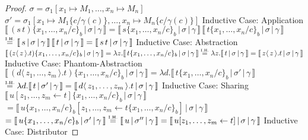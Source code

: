 \documentclass[a4paper,UKenglish,cleveref, autoref]{lipics-v2019}
\newcommand{\abs}[2]{\lambda #1 . #2}
\newcommand{\app}[2]{#1 \, #2}
\newcommand{\fake}[3]{#1 \langle \, #2 \, \rangle . #3}
\newcommand{\share}[3]{#1 [#2 \leftarrow #3]}
\newcommand{\sub}[3]{#1 \{ #2 / #3 \}}
\newcommand{\psub}[3]{#1 \{ #2 / #3 \}_{b}}
\newcommand{\readbackwmap}[3]{\llbracket \, #1 \, \vert \, #2 \, \vert \, #3  \, \rrbracket }
\newcommand{\IH}{\stackrel{\hbox{\tiny I.H.}}{\hbox{=}}}
\begin{document}
\begin{proof}
$\sigma = \sigma_{1} [x_{1} \mapsto M_{1} , \dots , x_{n} \mapsto M_{n} ]$
\newline
$\sigma' = \sigma_{1} [ x_{1} \mapsto M_{1} \sub{}{c}{\gamma(c)} , \dots , x_{n} \mapsto M_{n} \sub{}{c}{\gamma(c)} ]$
\newline
\newline
Inductive Case: Application
\newline
$\readbackwmap{(\app{s}{t})  \psub{}{x_{1}, \dots, x_{n}}{c}}{\sigma}{\gamma} = \app{\readbackwmap{s\psub{}{x_{1}, \dots, x_{n}}{c}}{\sigma}{\gamma}}{\readbackwmap{t\psub{}{x_{1}, \dots, x_{n}}{c}}{\sigma}{\gamma}}$
\newline
$\IH  \app{\readbackwmap{s}{\sigma}{\gamma}}{\readbackwmap{t}{\sigma}{\gamma}} = \readbackwmap{\app{s}{t}}{\sigma}{\gamma}$
\newline
\newline
Inductive Case: Abstraction
\newline
$\readbackwmap{(\fake{z}{z}{t})  \psub{}{x_{1}, \dots, x_{n}}{c}}{\sigma}{\gamma} = \abs{z}{\readbackwmap{t \psub{}{x_{1}, \dots, x_{n}}{c}}{\sigma}{\gamma}} \IH \abs{z}{\readbackwmap{t}{\sigma}{\gamma}} = \readbackwmap{\fake{z}{z}{t}}{\sigma}{\gamma}$
\newline
\newline
Inductive Case: Phantom-Abstraction
\newline
$\readbackwmap{(\fake{d}{z_{1}, \dots, z_{m}}{t}) \psub{}{x_{1}, \dots, x_{n}}{c}}{\sigma}{\gamma} = \abs{d}{\readbackwmap{t  \psub{}{x_{1}, \dots, x_{n}}{c}}{\sigma'}{\gamma}}$
\newline
$\IH \abs{d}{\readbackwmap{t}{\sigma'}{\gamma}} = \readbackwmap{\fake{d}{z_{1}, \dots, z_{m}}{t}}{\sigma}{\gamma}$
\newline
\newline
Inductive Case: Sharing
\newline
$\readbackwmap{\share{u}{z_{1}, \dots, z_{m}}{t} \psub{}{x_{1}, \dots, x_{n}}{c}}{\sigma}{\gamma}$
\newline
$ = \readbackwmap{\share{u \psub{}{x_{1}, \dots, x_{n}}{c}}{z_{1}, \dots, z_{m}}{t \psub{}{x_{1}, \dots, x_{n}}{c}} }{\sigma}{\gamma} $
\newline
$= \readbackwmap{u \psub{}{x_{1}, \dots, x_{n}}{c}}{\sigma'}{\gamma} \IH \readbackwmap{u}{\sigma''}{\gamma} = \readbackwmap{\share{u}{z_{1}, \dots, z_{m}}{t}}{\sigma}{\gamma}$
\newline
\newline
Inductive Case: Distributor
\newline

\end{proof}
\end{document}
